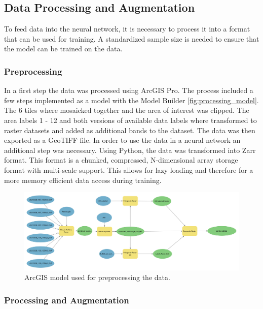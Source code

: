 \subsection{Data Processing and Augmentation}%

To feed data into the neural network, it is necessary to process it into a format that can be used for training.
A standardized sample size is needed to ensure that the model can be trained on the data.


\subsubsection{Preprocessing}%
In a first step the data was processed using ArcGIS Pro. The process included a few steps implemented as
a model with the Model Builder \autoref{fig:processing_model}. The 6 tiles where mosaicked together and the area of interest 
was clipped. The area labels 1 - 12 and both versions of available data labels where transformed to raster datasets
and added as additional bands to the dataset. The data was then exported as a GeoTIFF file.
In order to use the data in a neural network an additional step was necessary. Using Python,
the data was transformed into Zarr format. This format is a chunked, compressed, N-dimensional array
storage format with multi-scale support. This allows for lazy loading and therefore for a more memory
efficient data access during training.

\begin{figure}[H]
    \centering
    \captionsetup{width=0.8\linewidth}
    \includegraphics[width=\linewidth]{figures/ArcGIS_Model.png}
    \caption{ArcGIS model used for preprocessing the data.}
    \label{fig:processing_model}
\end{figure}


\subsubsection{Processing and Augmentation}%

